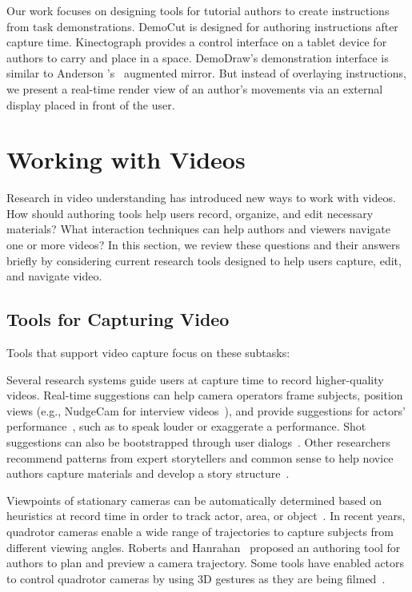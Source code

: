 Our work focuses on designing tools for tutorial authors to create instructions from task demonstrations. DemoCut is designed for authoring instructions after capture time. Kinectograph provides a control interface on a tablet device for authors to carry and place in a space. DemoDraw's demonstration interface is similar to Anderson \ea{}'s~\cite{Anderson:2013:YEM:2501988.2502045} augmented mirror. But instead of overlaying instructions, we present a real-time render view of an author's movements via an external display placed in front of the user.


\section{Working with Videos}
\label{related_videos}

Research in video understanding has introduced new ways to work with videos. How should authoring tools help users record, organize, and edit necessary materials? What interaction techniques can help authors and viewers navigate one or more videos?
In this section, we review these questions and their answers briefly by considering current research tools designed to help users capture, edit, and navigate video.


\subsection{Tools for Capturing Video}
Tools that support video capture focus on these subtasks:

Several research systems guide users at capture time to record higher-quality videos.
Real-time suggestions can help camera operators frame subjects, position views (e.g., NudgeCam for interview videos~\cite{Carter:2010}), and provide suggestions for actors' performance~\cite{Heer:2004ba,Davis:2003cu}, such as to speak louder or exaggerate a performance. Shot suggestions can also be bootstrapped through user dialogs~\cite{Adams:2005}.
%
Other researchers recommend patterns from expert storytellers and common sense to help novice authors capture materials and develop a story structure~\cite{Barry:2003:MCC:957013.957152,Kim:2015:MSN:2702123.2702507}.

Viewpoints of stationary cameras can be automatically determined based on heuristics at record time in order to track actor, area, or object~\cite{Ranjan:2008,Okumura:2011tr}.
%
In recent years, quadrotor cameras enable a wide range of trajectories to capture subjects from different viewing angles. Roberts and Hanrahan~\cite{Roberts:2016:GDF:2897824.2925980} proposed an authoring tool for authors to plan and preview a camera trajectory.
Some tools have enabled actors to control quadrotor cameras by using 3D gestures as they are being filmed~\cite{Cauchard:2015:DME:2750858.2805823,Pfeil:2013:EGM:2449396.2449429}.

